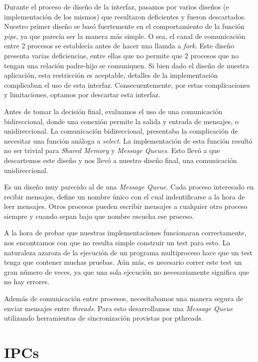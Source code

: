 \documentclass[a4paper,10pt]{article}
\begin{document}
Durante el proceso de diseño de la interfaz, pasamos por varios diseños (e implementación de los mismos) que resultaron deficientes y fueron descartados.
Nuestro primer diseño se basó fuertemente en el comportamiento de la función \textit{pipe}, ya que parecía ser la manera más simple.
O sea, el canal de comunicación entre 2 procesos se establecía antes de hacer una llamda a \textit{fork}.
Este diseño presenta varias deficiencias, entre ellas que no permite que 2 procesos que no tengan una relación padre-hijo se comuniquen.
Si bien dado el diseño de nuestra aplicación, esta restricción es aceptable, detalles de la implementación complicaban el uso de esta interfaz.
Consecuentemente, por estas complicaciones y limitaciones, optamos por descartar esta interfaz.

Antes de tomar la decisión final, evaluamos el uso de una comunicación bidireccional, donde una conexión permite la salida y entrada de mensajes, o unidireccional.
La comunicación bidireccional, presentaba la complicación de necesitar una función análoga a \textit{select}.
La implementación de esta función resultó no ser trivial para \textit{Shared Memory} y \textit{Message Queues}.
Esto llevó a que descartemos este diseño y nos llevó a nuestro diseño final, una comunicación unidireccional.

Es un diseño muy parecido al de una \textit{Message Queue}.
Cada proceso interesado en recibir mensajes, define un nombre único con el cual indentificarse a la hora de leer mensajes.
Otros procesos pueden escribir mensajes a cualquier otro proceso siempre y cuando sepan bajo que nombre escucha ese proceso.

A la hora de probar que nuestras implementaciones funcionaran correctamente, nos encontramos con que no resulta simple construir un test para esto.
La naturaleza azaroza de la ejecución de un programa multiproceso hace que un test tenga que contener muchas pruebas.
Aún más, es necesario correr este test un gran número de veces, ya que una sola ejecución no necesariamente significa que no hay errores.

Además de comunicación entre procesos, necesitabamos una manera segura de enviar mensajes entre \textit{threads}.
Para esto desarrollamos una \textit{Message Queue} utilizando herramientas de sincronización provistas por pthreads.

\newpage
\section{IPCs}
\end{document}
